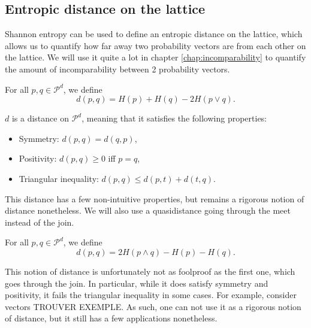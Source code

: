 \subsection{Entropic distance on the lattice} \label{sec:entropic_distances}

Shannon entropy can be used to define an entropic distance on the lattice, which allows us to quantify how far away two probability vectors are from each other on the lattice. We will use it quite a lot in chapter \ref{chap:incomparability} to quantify the amount of incomparability between 2 probability vectors.

\begin{definition} \label{def:entropic_distance}
    For all $p, q \in \mathcal{P}^d$, we define
    \begin{equation}
        d(p, q) = H(p) + H(q) - 2H(p \vee q).
    \end{equation}
\end{definition}

\begin{theorem}
    $d$ is a distance on $\mathcal{P}^d$, meaning that it satisfies the following properties:
    \begin{itemize}
        \item Symmetry: $d(p, q) = d(q, p)$,
        \item Positivity: $d(p, q) \geq 0$  iff $p = q$,
        \item Triangular inequality: $d(p, q) \leq d(p, t) + d(t, q)$.
    \end{itemize}
\end{theorem}

This distance has a few non-intuitive properties, but remains a rigorous notion of distance nonetheless. %
We will also use a quasidistance going through the meet instead of the join.

\begin{definition} \label{def:entropic_quasidistance}
    For all $p, q \in \mathcal{P}^d$, we define
    \begin{equation}
        d(p, q) = 2H(p \wedge q) - H(p) - H(q).
    \end{equation}
\end{definition}

This notion of distance is unfortunately not as foolproof as the first one, which goes through the join. In particular, while it does satisfy symmetry and positivity, it fails the triangular inequality in some cases. For example, consider vectors TROUVER EXEMPLE. As such, one can not use it as a rigorous notion of distance, but it still has a few applications nonetheless.

